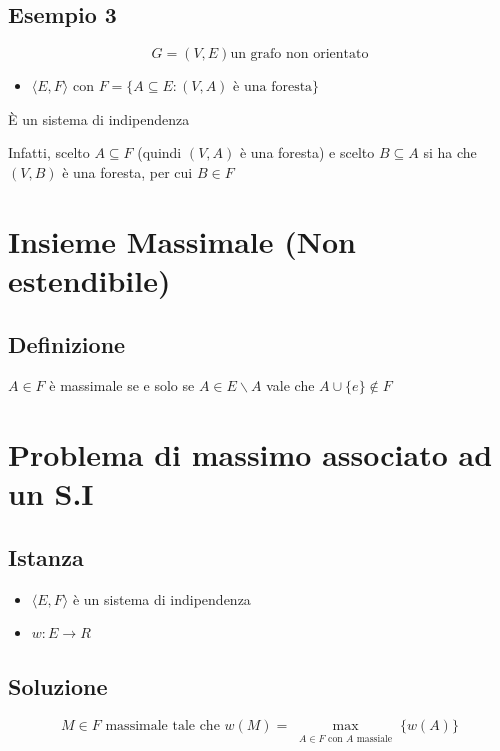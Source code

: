 \newpage
\subsection{Esempio 3}
$$
G = (V,E) \text{un grafo non orientato}
$$

\begin{itemize}
    \item $\langle E,F \rangle$ con $F = \{A \subseteq E : (V,A) \text{ è una foresta}\}$
\end{itemize}

\begin{center}
    È un sistema di indipendenza
\end{center}

Infatti, scelto $A \subseteq F$ (quindi $(V,A)$ è una foresta) e scelto $B \subseteq A$ si ha che $(V,B)$ è una foresta, per cui $B \in F$


\section{Insieme Massimale (Non estendibile)}

\subsection{Definizione}

$A \in F$ è massimale se e solo se $A \in E \backslash A$ vale che $A \cup \{e\} \not \in F$

\section{Problema di massimo associato ad un S.I}

\subsection{Istanza}
\begin{itemize}
    \item $\langle E,F \rangle$ è un sistema di indipendenza
    \item $w: E \to R$
\end{itemize}

\subsection{Soluzione}
{
    \large 
    

    $$
    M \in F \text{ massimale tale che }
    w(M) = \max_{\substack{A \in F \text{ con } A \text{ massiale}}}\{w(A)\}
    $$
}

